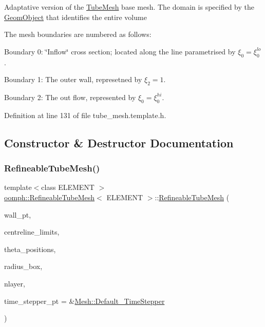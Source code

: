 Adaptative version of the \hyperlink{classoomph_1_1TubeMesh}{Tube\+Mesh} base mesh. The domain is specified by the \hyperlink{classoomph_1_1GeomObject}{Geom\+Object} that identifies the entire volume

The mesh boundaries are numbered as follows\+:
\begin{DoxyItemize}
\item Boundary 0\+: \char`\"{}\+Inflow\char`\"{} cross section; located along the line parametrised by $ \xi_0 = \xi_0^{lo} $.
\item Boundary 1\+: The outer wall, represetned by $\xi_2 = 1$.
\item Boundary 2\+: The out flow, represented by $\xi_0 = \xi_0^{hi}$. 
\end{DoxyItemize}

Definition at line 131 of file tube\+\_\+mesh.\+template.\+h.



\subsection{Constructor \& Destructor Documentation}
\mbox{\label{classoomph_1_1RefineableTubeMesh_a0b8e2307c2d4594196f78a6278d9bbf7}} 
\subsubsection{\texorpdfstring{Refineable\+Tube\+Mesh()}{RefineableTubeMesh()}}
{\footnotesize\ttfamily template$<$class E\+L\+E\+M\+E\+NT $>$ \\
\hyperlink{classoomph_1_1RefineableTubeMesh}{oomph\+::\+Refineable\+Tube\+Mesh}$<$ E\+L\+E\+M\+E\+NT $>$\+::\hyperlink{classoomph_1_1RefineableTubeMesh}{Refineable\+Tube\+Mesh} (\begin{DoxyParamCaption}\item[{\hyperlink{classoomph_1_1GeomObject}{Geom\+Object} $\ast$}]{wall\+\_\+pt,  }\item[{const \hyperlink{classoomph_1_1Vector}{Vector}$<$ double $>$ \&}]{centreline\+\_\+limits,  }\item[{const \hyperlink{classoomph_1_1Vector}{Vector}$<$ double $>$ \&}]{theta\+\_\+positions,  }\item[{const \hyperlink{classoomph_1_1Vector}{Vector}$<$ double $>$ \&}]{radius\+\_\+box,  }\item[{const unsigned \&}]{nlayer,  }\item[{\hyperlink{classoomph_1_1TimeStepper}{Time\+Stepper} $\ast$}]{time\+\_\+stepper\+\_\+pt = {\ttfamily \&\hyperlink{classoomph_1_1Mesh_a12243d0fee2b1fcee729ee5a4777ea10}{Mesh\+::\+Default\+\_\+\+Time\+Stepper}} }\end{DoxyParamCaption})\hspace{0.3cm}{\ttfamily [inline]}}



